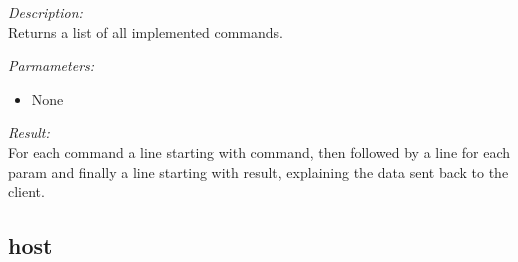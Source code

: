 \begin{description}
\item {\it Description:}\\
Returns a list of all implemented commands.
\item {\it Parmameters:}
\begin{itemize}
\item None
\end{itemize}
\item {\it Result:}\\
For each command a line starting with command, then followed by a line for each param and finally a line starting with result, explaining the data sent back to the client.
\end{description}

\subsection{host}

